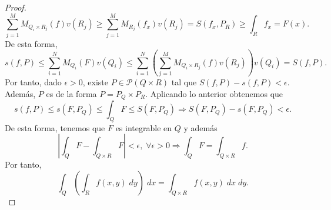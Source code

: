 \begin{proof}
\[\sum^{M}_{j = 1}M_{Q_{i}\times R_{j}}\left(f\right)v\left(R_{j}\right) \geq \sum^{M}_{j = 1}M_{R_{j}}\left(f_{x}\right)v\left(R_{j}\right)=S\left(f_{x}, P_{R}\right) \geq \int _{R}f_{x} =F\left(x\right) .\]
De esta forma, 
\[s\left(f,P\right)\leq \sum^{N}_{i = 1}M_{Q_{i}}\left(F\right)v\left(Q_{i}\right)\leq\sum^{N}_{i = 1}\left(\sum^{M}_{j = 1}M_{Q_{i} \times R_{j}}\left(f\right)v\left(R_{j}\right)\right)v\left(Q_{i}\right) = S\left(f,P\right) .\]
Por tanto, dado $\displaystyle \epsilon > 0 $, existe $\displaystyle P \in \mathcal{P}\left(Q \times R\right) $ tal que $\displaystyle S\left(f,P\right)-s\left(f,P\right)<\epsilon  $. Además, $\displaystyle P $ es de la forma $\displaystyle P = P_{Q} \times P_{R} $. Aplicando lo anterior obtenemos que
\[s\left(f,P\right)\leq s\left(F,P_{Q}\right)\leq \int _{Q}F \leq S\left(F,P_{Q}\right) \Rightarrow S\left(F, P_{Q}\right)-s\left(F, P_{Q}\right)<\epsilon  .\]
De esta forma, tenemos que $\displaystyle F $ es integrable en $\displaystyle Q $ y además
\[ \left|\int _{Q}F-\int _{Q \times R}F \right|<\epsilon, \; \forall \epsilon > 0 \Rightarrow \int _{Q}F =\int _{Q \times R}f  .\]
Por tanto,
\[\int _{Q}\left(\int _{R}f\left(x,y\right) \; dy\right) \; dx = \int _{Q \times R}f\left(x,y\right) \; dx \; dy .\]
\end{proof}

